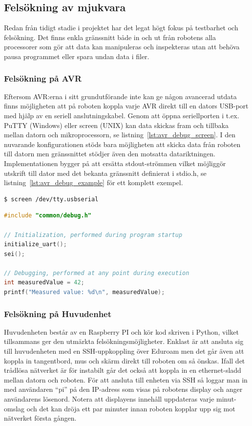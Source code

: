 \documentclass{article}
\begin{document}
\subsection{Felsökning av mjukvara}
Redan från tidigt stadie i projektet har det legat högt fokus på testbarhet och felsökning. Det finns enkla gränssnitt både in och ut från robotens alla processorer som gör att data kan manipuleras och inspekteras utan att behöva pausa programmet eller spara undan data i filer.

\subsubsection{Felsökning på AVR}
Eftersom AVR:erna i sitt grundutförande inte kan ge någon avancerad utdata finns möjligheten att på roboten koppla varje AVR direkt till en dators USB-port med hjälp av en seriell anslutningskabel. Genom att öppna seriellporten i t.ex. PuTTY (Windows) eller screen (UNIX) kan data skickas fram och tillbaka mellan datorn och mikroprocessorn, se listning~\ref{lst:avr_debug_screen}. I den nuvarande konfigurationen stöds bara möjligheten att skicka data från roboten till datorn men gränssnittet stödjer även den motsatta datariktningen. Implementationen bygger på att ersätta stdout-strömmen vilket möjliggör utskrift till dator med det bekanta gränssnitt definierat i stdio.h, se listning~\ref{lst:avr_debug_example} för ett komplett exempel.
\newline
\begin{lstlisting}[language=sh, label={lst:avr_debug_screen}, caption={Anslutning via screen}]
$ screen /dev/tty.usbserial
\end{lstlisting}

\begin{lstlisting}[language=C, label={lst:avr_debug_example}, caption=Exempel av utskrift]
#include "common/debug.h"

// Initialization, performed during program startup
initialize_uart();
sei();

// Debugging, performed at any point during execution
int measuredValue = 42;
printf("Measured value: %d\n", measuredValue);
\end{lstlisting}

\subsubsection{Felsökning på Huvudenhet}
Huvudenheten består av en Raspberry PI och kör kod skriven i Python, vilket tillsammans ger den utmärkta felsökningsmöjligheter. Enklast är att ansluta sig till huvudenheten med en SSH-uppkoppling över Eduroam men det går även att koppla in tangentbord, mus och skärm direkt till roboten om så önskas. Ifall det trådlösa nätverket är för instabilt går det också att koppla in en ethernet-sladd mellan datorn och roboten. För att ansluta till enheten via SSH så loggar man in med användaren ``pi'' på den IP-adress som visas på robotens display och anger användarens lösenord. Notera att displayens innehåll uppdateras varje minut-omslag och det kan dröja ett par minuter innan roboten kopplar upp sig mot nätverket första gången.
\end{document}
